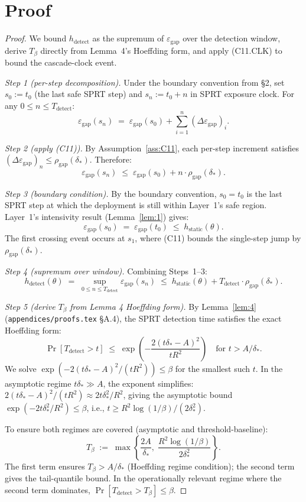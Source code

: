 \documentclass{article}
\newcommand{\deltastar}{\delta_{*}}
\newcommand{\rhogap}{\rho_{\mathrm{gap}}}
\newcommand{\epsgap}{\varepsilon_{\mathrm{gap}}}
\newcommand{\Tbeta}{T_{\beta}}
\begin{document}
\section{Proof}

\begin{proof}
We bound $h_{\mathrm{detect}}$ as the supremum of $\epsgap$ over
the detection window, derive $\Tbeta$ directly from Lemma~4's
Hoeffding form, and apply (C11.CLK) to bound the cascade-clock
event.

\emph{Step 1 (per-step decomposition).}  Under the boundary
convention from §2, set $s_0 := t_0$ (the last safe SPRT step) and
$s_n := t_0 + n$ in SPRT exposure clock.  For any
$0 \leq n \leq T_{\mathrm{detect}}$:
\[
  \epsgap(s_n) \;=\; \epsgap(s_0) + \sum_{i=1}^{n}
  (\Delta \epsgap)_i.
\]

\emph{Step 2 (apply (C11)).}  By Assumption~\ref{ass:C11}, each
per-step increment satisfies $(\Delta \epsgap)_n \leq
\rhogap(\deltastar)$.  Therefore:
\[
  \epsgap(s_n) \;\leq\; \epsgap(s_0) + n \cdot
  \rhogap(\deltastar).
\]

\emph{Step 3 (boundary condition).}  By the boundary convention,
$s_0 = t_0$ is the last SPRT step at which the deployment is still
within Layer~1's safe region.  Layer~1's intensivity result
(Lemma~\ref{lem:1}) gives:
\[
  \epsgap(s_0) \;=\; \epsgap(t_0) \;\leq\;
  h_{\mathrm{static}}(\theta).
\]
The first crossing event occurs at $s_1$, where (C11) bounds the
single-step jump by $\rhogap(\deltastar)$.

\emph{Step 4 (supremum over window).}  Combining Steps~1--3:
\[
  h_{\mathrm{detect}}(\theta) \;=\;
  \sup_{0 \leq n \leq T_{\mathrm{detect}}} \epsgap(s_n)
  \;\leq\; h_{\mathrm{static}}(\theta) +
  T_{\mathrm{detect}} \cdot \rhogap(\deltastar).
\]

\emph{Step 5 (derive $\Tbeta$ from Lemma 4 Hoeffding form).}  By
Lemma~\ref{lem:4} (\texttt{appendices/proofs.tex} §A.4), the SPRT
detection time satisfies the exact Hoeffding form:
\[
  \Pr[T_{\mathrm{detect}} > t] \;\leq\;
  \exp\!\left(-\frac{2(t \deltastar - A)^2}{t R^2}\right)
  \quad \text{for } t > A/\deltastar.
\]
We solve $\exp(-2(t\deltastar - A)^2 / (t R^2)) \leq \beta$ for
the smallest such $t$.  In the asymptotic regime
$t \deltastar \gg A$, the exponent simplifies:
$2(t\deltastar - A)^2/(tR^2) \approx 2 t \deltastar^2/R^2$, giving
the asymptotic bound
$\exp(-2 t \deltastar^2/R^2) \leq \beta$, i.e.,
$t \geq R^2 \log(1/\beta) / (2 \deltastar^2)$.

To ensure both regimes are covered (asymptotic and threshold-baseline):
\[
  \Tbeta \;:=\;
  \max\!\left\{\frac{2A}{\deltastar},\;
  \frac{R^2 \log(1/\beta)}{2 \deltastar^2}\right\}.
\]
The first term ensures $\Tbeta > A/\deltastar$ (Hoeffding regime
condition); the second term gives the tail-quantile bound.  In the
operationally relevant regime where the second term dominates,
$\Pr[T_{\mathrm{detect}} > \Tbeta] \leq \beta$.


\end{proof}
\end{document}
